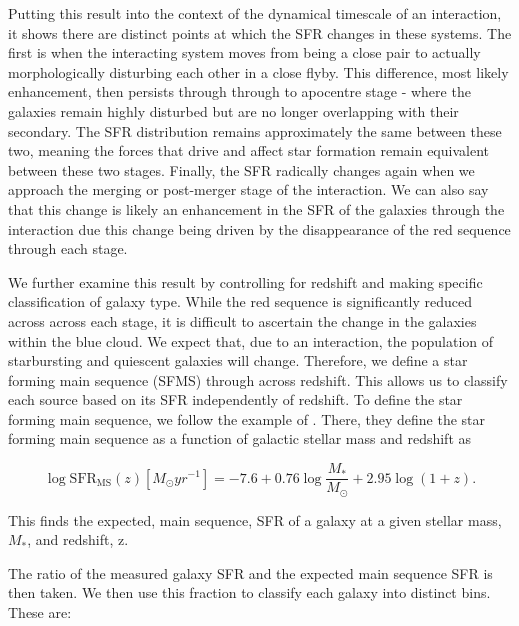 Putting this result into the context of the dynamical timescale of an interaction, it shows there are distinct points at which the SFR changes in these systems. The first is when the interacting system moves from being a close pair to actually morphologically disturbing each other in a close flyby. This difference, most likely enhancement, then persists through through to apocentre stage - where the galaxies remain highly disturbed but are no longer overlapping with their secondary. The SFR distribution remains approximately the same between these two, meaning the forces that drive and affect star formation remain equivalent between these two stages. Finally, the SFR radically changes again when we approach the merging or post-merger stage of the interaction. We can also say that this change is likely an enhancement in the SFR of the galaxies through the interaction due this change being driven by the disappearance of the red sequence through each stage.

We further examine this result by controlling for redshift and making specific classification of galaxy type. While the red sequence is significantly reduced across across each stage, it is difficult to ascertain the change in the galaxies within the blue cloud. We expect that, due to an interaction, the population of starbursting and quiescent galaxies will change. Therefore, we define a star forming main sequence (SFMS) through across redshift. This allows us to classify each source based on its SFR independently of redshift. To define the star forming main sequence, we follow the example of \citet{2019MNRAS.484.4360A}. There, they define the star forming main sequence as a function of galactic stellar mass and redshift as

\begin{equation}
    \log \text{SFR}_{\text{MS}}(z)[M_\odot yr^{-1}] = -7.6 + 0.76\log\frac{M_*}{M_\odot} + 2.95\log(1+z).
\end{equation}

\noindent This finds the expected, main sequence, SFR of a galaxy at a given stellar mass, $M_*$, and redshift, z.

The ratio of the measured galaxy SFR and the expected main sequence SFR is then taken. We then use this fraction to classify each galaxy into distinct bins. These are:

